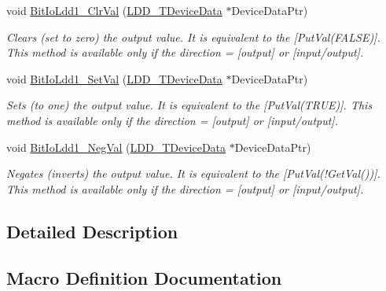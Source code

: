 \begin{DoxyCompactItemize}
void \hyperlink{group___bit_io_ldd1__module_ga85c0f352eded8016d2e47bf13c10e14c}{Bit\+Io\+Ldd1\+\_\+\+Clr\+Val} (\hyperlink{group___p_e___types__module_gac5cf1362f1f0e3a2ce71b1bf2276d091}{L\+D\+D\+\_\+\+T\+Device\+Data} $\ast$Device\+Data\+Ptr)
\begin{DoxyCompactList}\small\item\em Clears (set to zero) the output value. It is equivalent to the \mbox{[}Put\+Val(\+F\+A\+L\+S\+E)\mbox{]}. This method is available only if the direction = {\itshape \mbox{[}output\mbox{]}} or {\itshape \mbox{[}input/output\mbox{]}}. \end{DoxyCompactList}\item 
void \hyperlink{group___bit_io_ldd1__module_ga64282ec63632688f21f6b06477f48214}{Bit\+Io\+Ldd1\+\_\+\+Set\+Val} (\hyperlink{group___p_e___types__module_gac5cf1362f1f0e3a2ce71b1bf2276d091}{L\+D\+D\+\_\+\+T\+Device\+Data} $\ast$Device\+Data\+Ptr)
\begin{DoxyCompactList}\small\item\em Sets (to one) the output value. It is equivalent to the \mbox{[}Put\+Val(\+T\+R\+U\+E)\mbox{]}. This method is available only if the direction = {\itshape \mbox{[}output\mbox{]}} or {\itshape \mbox{[}input/output\mbox{]}}. \end{DoxyCompactList}\item 
void \hyperlink{group___bit_io_ldd1__module_ga6e66b99e22798dceaadbfffe984ce5d3}{Bit\+Io\+Ldd1\+\_\+\+Neg\+Val} (\hyperlink{group___p_e___types__module_gac5cf1362f1f0e3a2ce71b1bf2276d091}{L\+D\+D\+\_\+\+T\+Device\+Data} $\ast$Device\+Data\+Ptr)
\begin{DoxyCompactList}\small\item\em Negates (inverts) the output value. It is equivalent to the \mbox{[}Put\+Val(!\+Get\+Val())\mbox{]}. This method is available only if the direction = {\itshape \mbox{[}output\mbox{]}} or {\itshape \mbox{[}input/output\mbox{]}}. \end{DoxyCompactList}\end{DoxyCompactItemize}


\subsection{Detailed Description}


\subsection{Macro Definition Documentation}
\mbox{\label{group___bit_io_ldd1__module_gad93237ef8b0ff5074e33422fa91fff9c}} 
